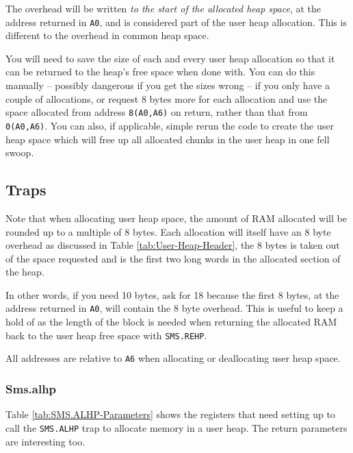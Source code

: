 The overhead will be written \emph{to the start of the allocated heap
space}, at the address returned in \texttt{A0}, and is considered
part of the user heap allocation. This is different to the overhead
in common heap space.

You will need to save the size of each and every user heap allocation
so that it can be returned to the heap's free space when done with.
You can do this manually -- possibly dangerous if you get the sizes
wrong -- if you only have a couple of allocations, or request 8 bytes
more for each allocation and use the space allocated from address
\texttt{8(A0,A6)} on return, rather than that from \texttt{0(A0,A6)}.
You can also, if applicable, simple rerun the code to create the user
heap space which will free up all allocated chunks in the user heap
in one fell swoop.

\subsection{Traps}

Note that when allocating user heap space, the amount of RAM allocated
will be rounded up to a multiple of 8 bytes. Each allocation will
itself have an 8 byte overhead as discussed in Table \ref{tab:User-Heap-Header},
the 8 bytes is taken out of the space requested and is the first two
long words in the allocated section of the heap. 

In other words, if you need 10 bytes, ask for 18 because the first
8 bytes, at the address returned in \texttt{A0}, will contain the
8 byte overhead. This is useful to keep a hold of as the length of
the block is needed when returning the allocated RAM back to the user
heap free space with \texttt{SMS.REHP}.

All addresses are relative to \texttt{A6} when allocating or deallocating
user heap space.

\subsubsection{Sms.alhp}

Table \ref{tab:SMS.ALHP-Parameters} shows the registers that need
setting up to call the \texttt{SMS.ALHP} trap to allocate memory in
a user heap. The return parameters are interesting too.

